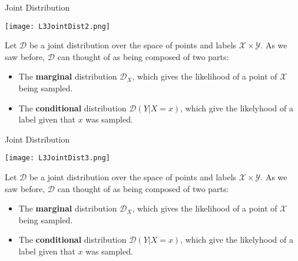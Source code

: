 \documentclass[10pt, table, handout]{beamer}
\newcommand{\cD}{\ensuremath{\mathcal{D}}}
\newcommand{\cX}{\ensuremath{\mathcal{X}}}
\newcommand{\cY}{\ensuremath{\mathcal{Y}}}
\begin{document}
\begin{frame}[fragile]{Joint Distribution}
  \begin{minipage}[t][0.5\textheight][t]{\textwidth}
    \texttt{[image: L3JointDist2.png]}
        \centering
  \end{minipage}
  \vfill
  \begin{minipage}[t][0.5\textheight][t]{\textwidth}
Let $\cD$ be a joint distribution over the space of points and labels $\cX\times\cY$. As we saw before, $\cD$ can thought of as being composed of two parts: 
\begin{itemize}
\item[] The \textbf{marginal} distribution $\cD_X$, which gives the likelihood of a point of $\cX$ being sampled.
\item[] The \textbf{conditional} distribution $\cD(Y|X = x)$, which give the likelyhood of a label given that $x$ was sampled. 
\end{itemize}
  \end{minipage}
\end{frame}




\begin{frame}[fragile]{Joint Distribution}
  \begin{minipage}[t][0.5\textheight][t]{\textwidth}
    \texttt{[image: L3JointDist3.png]}
        \centering
  \end{minipage}
  \vfill
  \begin{minipage}[t][0.5\textheight][t]{\textwidth}
Let $\cD$ be a joint distribution over the space of points and labels $\cX\times\cY$. As we saw before, $\cD$ can thought of as being composed of two parts: 
\begin{itemize}
\item[] The \textbf{marginal} distribution $\cD_X$, which gives the likelihood of a point of $\cX$ being sampled.
\item[] The \textbf{conditional} distribution $\cD(Y|X = x)$, which give the likelyhood of a label given that $x$ was sampled. 
\end{itemize}
  \end{minipage}
\end{frame}
\end{document}
